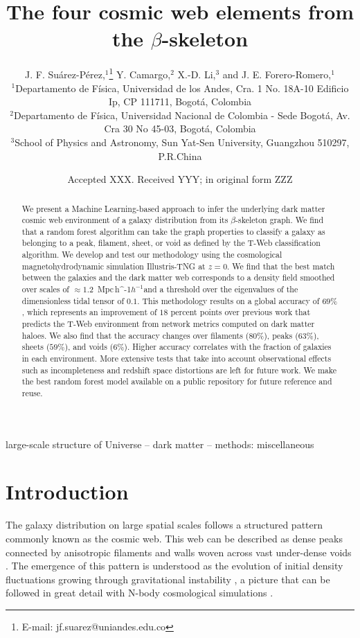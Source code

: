 \documentclass[usenatbib]{mnras}
\title[Cosmic web elements from the $\beta$-skeleton]{The four cosmic web elements from the $\beta$-skeleton}
\author[J. F. Su\'arez-P\'erez et al.]{
J. F. Su\'arez-P\'erez,$^{1}$\thanks{E-mail: jf.suarez@uniandes.edu.co}
Y. Camargo,$^{2}$ 
X.-D. Li,$^{3}$
and J. E. Forero-Romero,$^{1}$
\\
$^{1}$Departamento de F\'isica, Universidad de los Andes, Cra. 1
No. 18A-10 Edificio Ip, CP 111711, Bogot\'a, Colombia\\ 
$^{2}$Departamento de F\'isica, Universidad Nacional de Colombia -
Sede Bogot\'a, Av. Cra 30 No 45-03, Bogot\'a, Colombia\\ 
$^{3}$School of Physics and Astronomy, Sun Yat-Sen University,
Guangzhou 510297, P.R.China\\ 
}
\date{Accepted XXX. Received YYY; in original form ZZZ}
\newcommand{\Mpch}{\,{\rm Mpc}\,\ifmmode h^{-1}\else $h^{-1}$\fi}
\begin{document}
\label{firstpage}
\pagerange{\pageref{firstpage}--\pageref{lastpage}}
\maketitle

\begin{abstract}
We present a Machine Learning-based approach to infer the underlying dark matter cosmic web environment of a galaxy distribution from its $\beta$-skeleton graph.
We find that a random forest algorithm can take the graph properties to classify a galaxy as belonging to a peak, filament, sheet, or void as defined by the T-Web classification algorithm.
We develop and test our methodology using the cosmological magnetohydrodynamic simulation Illustris-TNG at $z=0$.
We find that the best match between the galaxies and the dark matter web corresponds to a density field smoothed over scales of $\approx 1.2$ \Mpch and a threshold over the eigenvalues of the dimensionless tidal tensor of $0.1$.
This methodology results on a global accuracy of $69\%$, which represents an improvement of $18$ percent points over previous work that predicts the T-Web environment from network metrics computed on dark matter haloes.
We also find that the accuracy changes over filaments ($80\%$), peaks ($63\%$), sheets ($59\%$), and voids ($6\%$).
Higher accuracy correlates with the fraction of galaxies in each environment.
More extensive tests that take into account observational effects such as incompleteness and redshift space distortions are left for future work.
We make the best random forest model available on a public repository for future reference and reuse.
\end{abstract}

\begin{keywords}
large-scale structure of Universe -- dark matter -- methods: miscellaneous
\end{keywords}


\section{Introduction}
The galaxy distribution on large spatial scales follows a structured 
pattern commonly known as the cosmic web. 
This web can be described as dense peaks connected by anisotropic
filaments and walls woven across vast under-dense voids 
\citep{Bond1996}.  
The emergence of this pattern is understood as the evolution of
initial density fluctuations growing through gravitational instability
\citep{ZelDovich1970,White1987}, a picture that can be followed in
great detail with N-body cosmological simulations
\citep{Schmalzing1999,Vogelsberger2014}.     
\end{document}
